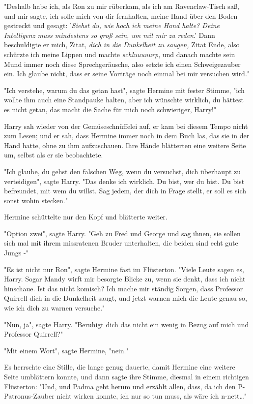 {"Deshalb habe ich, als Ron zu mir rüberkam, als ich am Ravenclaw-Tisch saß, und mir sagte, ich solle mich von dir fernhalten, meine Hand über den Boden gestreckt und gesagt: '\emph{Siehst du, wie hoch ich meine Hand halte? Deine Intelligenz muss mindestens so groß sein, um mit mir zu reden}.' Dann beschuldigte er mich, Zitat, \emph{dich in die Dunkelheit zu saugen,} Zitat Ende, also schürzte ich meine Lippen und machte \emph{schluuuuurp}, und danach machte sein Mund immer noch diese Sprechgeräusche, also setzte ich einen Schweigezauber ein. Ich glaube nicht, dass er seine Vorträge noch einmal bei mir versuchen wird."

"Ich verstehe, warum du das getan hast", sagte Hermine mit fester Stimme, "ich wollte ihm auch eine Standpauke halten, aber ich wünschte wirklich, du hättest es nicht getan, das macht die Sache für mich noch schwieriger, Harry!"

Harry sah wieder von der Gemüseschnüffelei auf, er kam bei diesem Tempo nicht zum Lesen; und er sah, dass Hermine immer noch in dem Buch las, das sie in der Hand hatte, ohne zu ihm aufzuschauen. Ihre Hände blätterten eine weitere Seite um, selbst als er sie beobachtete.

"Ich glaube, du gehst den falschen Weg, wenn du versuchst, dich überhaupt zu verteidigen", sagte Harry. "Das denke ich wirklich. Du bist, wer du bist. Du bist befreundet, mit wem du willst. Sag jedem, der dich in Frage stellt, er soll es sich sonst wohin stecken."

Hermine schüttelte nur den Kopf und blätterte weiter.

"Option zwei", sagte Harry. "Geh zu Fred und George und sag ihnen, sie sollen sich mal mit ihrem missratenen Bruder unterhalten, die beiden sind echt gute Jungs -"

"Es ist nicht nur Ron", sagte Hermine fast im Flüsterton. "Viele Leute sagen es, Harry. Sogar Mandy wirft mir besorgte Blicke zu, wenn sie denkt, dass ich nicht hinschaue. Ist das nicht komisch? Ich mache mir ständig Sorgen, dass Professor Quirrell dich in die Dunkelheit saugt, und jetzt warnen mich die Leute genau so, wie ich dich zu warnen versuche."

"Nun, ja", sagte Harry. "Beruhigt dich das nicht ein wenig in Bezug auf mich und Professor Quirrell?"

"Mit einem Wort", sagte Hermine, "nein."

Es herrschte eine Stille, die lange genug dauerte, damit Hermine eine weitere Seite umblättern konnte, und dann sagte ihre Stimme, diesmal in einem richtigen Flüsterton: "Und, und Padma geht herum und erzählt allen, dass, da ich den P-Patronus-Zauber nicht wirken konnte, ich nur so tun muss, als wäre ich n-nett…"

}
